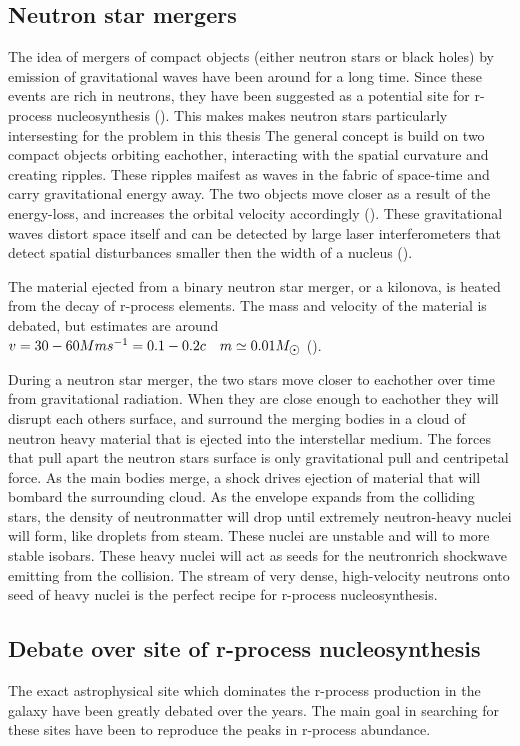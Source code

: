 \subsection{Neutron star mergers}
The idea of mergers of compact objects (either neutron stars or black holes) by emission of gravitational waves have been around for a long time. Since these events are rich in neutrons, they have been suggested as a potential site for r-process nucleosynthesis
().
This makes makes neutron stars particularly intersesting for the problem in this thesis 
The general concept is build on two compact objects orbiting eachother, interacting with the spatial curvature and creating ripples.
These ripples maifest as waves in the fabric of space-time and carry gravitational energy away.
The two objects move closer as a result of the energy-loss, and increases the orbital velocity accordingly ().
These gravitational waves distort space itself and can be detected by large laser interferometers that detect spatial disturbances smaller then the width of a nucleus ().

The material ejected from a binary neutron star merger, or a kilonova, is heated from the decay of r-process elements.
The mass and velocity of the material is debated,
but estimates are around $v=30-60 Mms^{-1} = 0.1-0.2c \quad m \simeq 0.01 \msol$ ().

During a neutron star merger, the two stars move closer to eachother over time from gravitational radiation. When they are close enough to eachother they will disrupt each others surface, and surround the merging bodies in a cloud of neutron heavy material that is ejected into the interstellar medium.
The forces that pull apart the neutron stars surface is only gravitational pull and centripetal force.
As the main bodies merge, a shock drives ejection of material that will bombard the surrounding cloud.
As the envelope expands from the colliding stars, the density of neutronmatter will drop until extremely neutron-heavy nuclei will form, like droplets from steam.
These nuclei are unstable and will \betadecay to more stable isobars.
These heavy nuclei will act as seeds for the neutronrich shockwave emitting from the collision.
The stream of very dense, high-velocity neutrons onto seed of heavy nuclei is the perfect recipe for r-process nucleosynthesis.

\subsection{Debate over site of r-process nucleosynthesis}
The exact astrophysical site which dominates the r-process production in the galaxy have been greatly debated over the years.
The main goal in searching for these sites have been to reproduce the peaks in r-process abundance.

